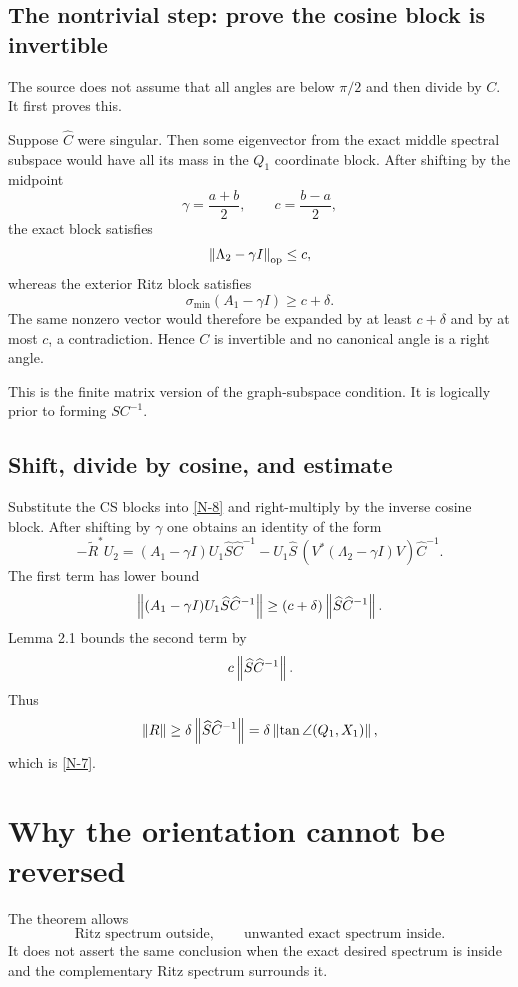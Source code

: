 \subsection{The nontrivial step: prove the cosine block is invertible}

The source does not assume that all angles are below $\pi/2$ and then divide by $C$. It first proves this.

Suppose $\widehat C$ were singular. Then some eigenvector from the exact middle spectral subspace would have all its mass in the $Q_1$ coordinate block. After shifting by the midpoint
\[
  \gamma=\frac{a+b}{2},
  \qquad
  c=\frac{b-a}{2},
\]
the exact block satisfies
\[
  \left\lVert \Lambda_2-\gamma I\right\rVert_{\mathrm{op}}\le c,
\]
whereas the exterior Ritz block satisfies
\[
  \sigma_{\min}(A_1-\gamma I)\ge c+\delta.
\]
The same nonzero vector would therefore be expanded by at least $c+\delta$ and by at most $c$, a contradiction. Hence $C$ is invertible and no canonical angle is a right angle.

This is the finite matrix version of the graph-subspace condition. It is logically prior to forming $SC^{-1}$.

\subsection{Shift, divide by cosine, and estimate}

Substitute the CS blocks into \eqref{N-8} and right-multiply by the inverse cosine block. After shifting by $\gamma$ one obtains an identity of the form
\begin{equation}
  -\widetilde R^*U_2
  =(A_1-\gamma I)U_1\widehat S\widehat C^{-1}
   -U_1\widehat S\,(V^*(\Lambda_2-\gamma I)V)\widehat C^{-1}.
  \tag{N-shifted}
\end{equation}
The first term has lower bound
\[
  \left\lVert (A_1-\gamma I)U_1\widehat S\widehat C^{-1}\right\rVert
  \ge(c+\delta)\left\lVert \widehat S\widehat C^{-1}\right\rVert.
\]
Lemma 2.1 bounds the second term by
\[
  c\left\lVert \widehat S\widehat C^{-1}\right\rVert.
\]
Thus
\[
  \left\lVert R\right\rVert
  \ge\delta\left\lVert \widehat S\widehat C^{-1}\right\rVert
  =\delta\left\lVert \tan\angle(Q_1,X_1)\right\rVert,
\]
which is \eqref{N-7}.

\section{Why the orientation cannot be reversed}

The theorem allows
\[
  \text{Ritz spectrum outside},
  \qquad
  \text{unwanted exact spectrum inside}.
\]
It does not assert the same conclusion when the exact desired spectrum is inside and the complementary Ritz spectrum surrounds it.

